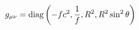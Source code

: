 \documentclass[preview]{standalone}
\begin{document}
\begin{align*}
g_{\mu\nu}=\text{diag}\left(-fc^2, {1\over f}, R^2, R^2\sin^2\theta\right)
\end{align*}
\end{document}
